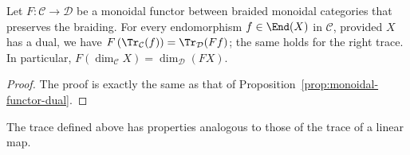 \begin{proposition}
	Let $F:\mathcal{C}\to\mathcal{D}$ be a monoidal functor between braided
	monoidal categories that preserves the braiding. For every endomorphism
	$f\in\End(X)$ in $\mathcal{C}$, provided $X$ has a dual, we have
$F\left(\Tr_{\mathcal{C}}(f)\right)=\Tr_{\mathcal{D}}(Ff)$; the same holds
for the right trace. In particular,
$F\left(\dim_{\mathcal{C}}X\right)=\dim_{\mathcal{D}}(FX)$.
\end{proposition}
\begin{proof}
	The proof is exactly the same as that of
	Proposition~\ref{prop:monoidal-functor-dual}.
\end{proof}

The trace defined above has properties analogous to those of the trace of a
linear map.

